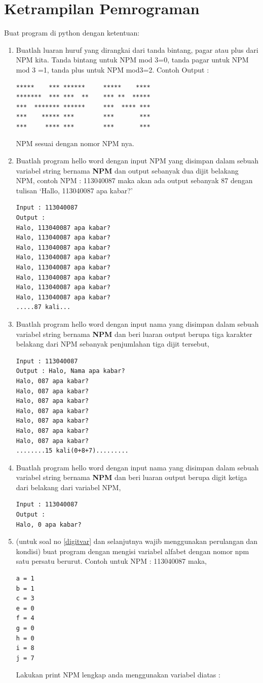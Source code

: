 \section{Ketrampilan Pemrograman}
Buat program di python dengan ketentuan:
\begin{enumerate}
\item
Buatlah luaran huruf yang dirangkai dari tanda bintang, pagar atau plus dari NPM kita.
Tanda bintang untuk NPM mod 3=0, tanda pagar untuk NPM mod 3 =1, tanda plus untuk NPM mod3=2.
Contoh Output : 
\begin{verbatim}
*****    *** ******     *****    ****
*******  *** ***  **    *** **  *****
***  ******* ******     ***  **** ***
***    ***** ***        ***       ***
***     **** ***        ***       ***
\end{verbatim}
NPM sesuai dengan nomor NPM nya.
\item
Buatlah program hello word dengan input NPM yang disimpan dalam sebuah variabel string bernama \textbf{NPM} dan output sebanyak dua dijit belakang NPM, 
contoh NPM : 113040087 maka akan ada output sebanyak 87 dengan tulisan `Hallo, 113040087 apa kabar?'
\begin{verbatim}
Input : 113040087
Output : 
Halo, 113040087 apa kabar? 
Halo, 113040087 apa kabar?
Halo, 113040087 apa kabar?
Halo, 113040087 apa kabar?
Halo, 113040087 apa kabar?
Halo, 113040087 apa kabar?
Halo, 113040087 apa kabar?
Halo, 113040087 apa kabar?
.....87 kali...
\end{verbatim}
\item
Buatlah program hello word dengan input nama yang disimpan dalam sebuah variabel string bernama \textbf{NPM} dan beri luaran output berupa tiga karakter belakang dari NPM sebanyak penjumlahan tiga dijit tersebut, 
\begin{verbatim}
Input : 113040087
Output : Halo, Nama apa kabar? 
Halo, 087 apa kabar?
Halo, 087 apa kabar?
Halo, 087 apa kabar?
Halo, 087 apa kabar?
Halo, 087 apa kabar?
Halo, 087 apa kabar?
Halo, 087 apa kabar?
........15 kali(0+8+7).........
\end{verbatim}
\item
Buatlah program hello word dengan input nama yang disimpan dalam sebuah variabel string bernama \textbf{NPM} dan beri luaran output berupa digit ketiga dari belakang dari variabel NPM, 
\begin{verbatim}
Input : 113040087
Output :
Halo, 0 apa kabar?
\end{verbatim}
\item
\label{digitvar}
(untuk soal no \ref{digitvar} dan selanjutnya wajib menggunakan perulangan dan kondisi) buat program dengan mengisi variabel alfabet dengan nomor npm satu persatu berurut.
Contoh untuk NPM : 113040087 maka,
\begin{verbatim}
a = 1
b = 1
c = 3
e = 0
f = 4
g = 0
h = 0
i = 8
j = 7
\end{verbatim}
Lakukan print NPM lengkap anda menggunakan variabel diatas :


\end{enumerate}
